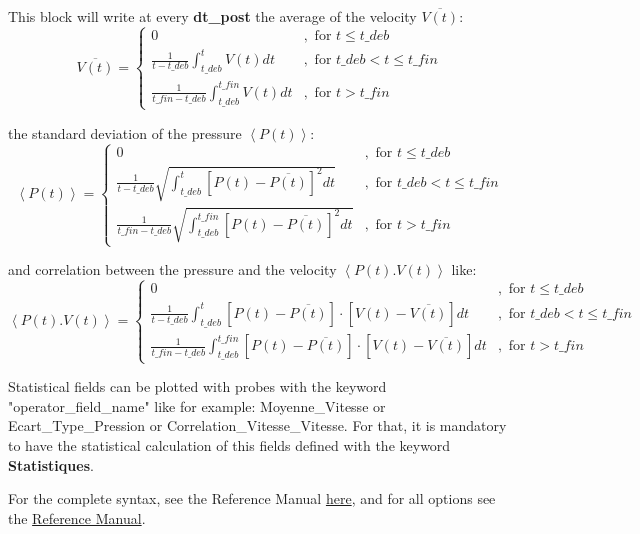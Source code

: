 \begin{itemize}
This block will write at every \textbf{dt\_post} the average of the velocity $\overline{V(t)}$:
\[
\overline{V(t)}=\left\{ \begin{array}{ll}
0 & ,\mbox{ for }t\leq t\mbox{\_}deb\\
\frac{1}{t-t\mbox{\_}deb}{\displaystyle \int_{t\mbox{\_}deb}^{t}V(t)dt} & ,\mbox{ for }t\mbox{\_}deb<t\leq t\mbox{\_}fin\\
\frac{1}{t\mbox{\_}fin-t\mbox{\_}deb}{\displaystyle \int_{t\mbox{\_}deb}^{t\mbox{\_}fin}V(t)dt} & ,\mbox{ for }t>t\mbox{\_}fin
\end{array}\right.
\]

the standard deviation of the pressure $\left\langle P(t)\right\rangle$:
\[
\left\langle P(t)\right\rangle=\left\{ \begin{array}{ll}
0 & ,\mbox{ for }t\leq t\mbox{\_}deb\\
\frac{1}{t-t\mbox{\_}deb}{\displaystyle \sqrt{\int_{t\mbox{\_}deb}^{t}\left[P(t)-\overline{P(t)}\right]^{2}dt}} & ,\mbox{ for }t\mbox{\_}deb<t\leq t\mbox{\_}fin\\
\frac{1}{t\mbox{\_}fin-t\mbox{\_}deb}{\displaystyle \sqrt{\int_{t\mbox{\_}deb}^{t\mbox{\_}fin}\left[P(t)-\overline{P(t)}\right]^{2}dt}} & ,\mbox{ for }t>t\mbox{\_}fin
\end{array}\right.
\]

and correlation between the pressure and the velocity $\left\langle P(t).V(t)\right\rangle$ like:
\[
\left\langle P(t).V(t)\right\rangle=\left\{ \begin{array}{ll}
0 & ,\mbox{ for }t\leq t\mbox{\_}deb\\
\frac{1}{t-t\mbox{\_}deb}{\displaystyle \int_{t\mbox{\_}deb}^{t}\left[P(t)-\overline{P(t)}\right]\cdot\left[V(t)-\overline{V(t)}\right]dt} & ,\mbox{ for }t\mbox{\_}deb<t\leq t\mbox{\_}fin\\
\frac{1}{t\mbox{\_}fin-t\mbox{\_}deb}{\displaystyle \int_{t\mbox{\_}deb}^{t\mbox{\_}fin}\left[P(t)-\overline{P(t)}\right]\cdot\left[V(t)-\overline{V(t)}\right]dt} & ,\mbox{ for }t>t\mbox{\_}fin
\end{array}\right.
\]


\begin{remark}
Statistical fields can be plotted with probes with the keyword "operator\_field\_name" like for example: Moyenne\_Vitesse or Ecart\_Type\_Pression or Correlation\_Vitesse\_Vitesse. For that, it is mandatory to have the statistical calculation of this fields defined with the keyword \textbf{Statistiques}.\\
\end{remark}

For the complete syntax, see the \trustref Reference Manual \href{\REFERENCEMANUAL\#corpspostraitement}{here}, and for all options see the \href{\REFERENCEMANUAL\#statsposts}{\trust Reference Manual}.
\end{itemize}



